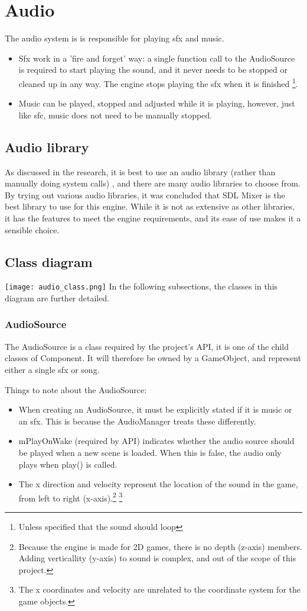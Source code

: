 \section{Audio}
The audio system is is responsible for playing sfx and music.
\begin{itemize}
    \item Sfx work in a 'fire and forget' way: a single function call to the AudioSource is required to start playing the sound, and it never needs to be stopped or cleaned up in any way. The engine stops playing the sfx when it is finished \footnote{Unless specified that the sound should loop}.
    \item Music can be played, stopped and adjusted while it is playing, however, just like sfc, music does not need to be manually stopped.
\end{itemize}

\subsection{Audio library}
As discussed in the research, it is best to use an audio library (rather than manually doing system calls)
, and there are many audio libraries to choose from. By trying out various audio libraries, it was concluded that
SDL Mixer is the best library to use for this engine. While it is not as extensive as other libraries,
it has the features to meet the engine requirements, and its ease of use makes it a sensible choice.

\subsection{Class diagram}
\texttt{[image: audio\_class.png]}
In the following subsections, the classes in this diagram are further detailed.
\subsubsection{AudioSource}
The AudioSource is a class required by the project's API, it is one of the child classes of Component.
It will therefore be owned by a GameObject, and represent either a single sfx or song.

Things to note about the AudioSource:
\begin{itemize}
    \item When creating an AudioSource, it must be explicitly stated if it is music or an sfx. This is because the AudioManager treats these differently.
    \item mPlayOnWake (required by API) indicates whether the audio source should be played when a new scene is loaded. When this is false, the audio only plays when play() is called.
    \item The x direction and velocity represent the location of the sound in the game, from left to right (x-axis).\footnote{Because the engine is made for 2D games, there is no depth (z-axis) members. Adding verticallity (y-axis) to sound is complex, and out of the scope of this project.} \footnote{The x coordinates and velocity are unrelated to the coordinate system for the game objects.}
\end{itemize}

